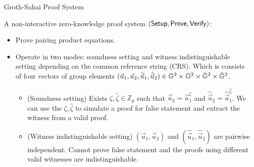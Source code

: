\begin{frame}{Groth-Sahai Proof System}

  A non-interactive zero-knowledge proof system $({\mathsf{Setup}}, {\mathsf{Prove}}, {\mathsf{Verify}})$:
  \pause
  \begin{itemize}
  \item Prove pairing product equations.
    \pause
  \item {\color{blue}Operate in two modes}: soundness setting and witness indistinguishable setting depending on the common reference string (CRS). Which is consists of four vectors of group elements $(\vec{u}_1, \vec{u}_2, \hat{\vec{u}}_1, \hat{\vec{u}}_2) \in \mathbb{G}^2 \times \mathbb{G}^2 \times \hat{\mathbb{G}}^2 \times \hat{\mathbb{G}}^2$.
    \pause
  	\begin{itemize}
  	\item  {\color{blue}(Soundness setting)} Exists $\zeta, \hat{\zeta} \in \mathbb{Z}_p$ such that $\vec{u}_2 = \vec{u}_1^\zeta$ and $\hat{\vec{u}}_2 = \hat{\vec{u}}_1^{\hat{\zeta}}$. We can use the $\zeta, \hat{\zeta}$ to simulate a proof for false statement and extract the witness from a valid proof.
          \pause
  	\item {\color{blue}(Witness indistinguishable setting)} $(\vec{u}_1, \vec{u}_2)$ and $(\hat{\vec{u}}_1,  \hat{\vec{u}}_2)$ are pairwise independent. Cannot prove false statement and the proofs using different valid witnesses are indistinguishable.
  	\end{itemize}
  \end{itemize}
  
\end{frame}





